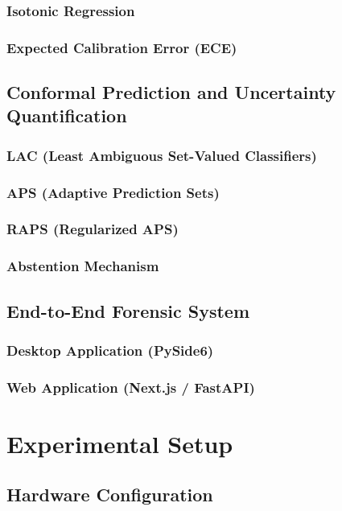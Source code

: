 \documentclass[12pt,a4paper]{book}
\theoremstyle{definition}
\theoremstyle{remark}
\begin{document}
\subsection{Isotonic Regression}
\subsection{Expected Calibration Error (ECE)}

\section{Conformal Prediction and Uncertainty Quantification}\label{sec:conformal}
\subsection{LAC (Least Ambiguous Set-Valued Classifiers)}
\subsection{APS (Adaptive Prediction Sets)}
\subsection{RAPS (Regularized APS)}
\subsection{Abstention Mechanism}

\section{End-to-End Forensic System}\label{sec:system}
\subsection{Desktop Application (PySide6)}
\subsection{Web Application (Next.js / FastAPI)}


\chapter{Experimental Setup}\label{chap:setup}

\section{Hardware Configuration}\label{sec:hardware}
\end{document}
